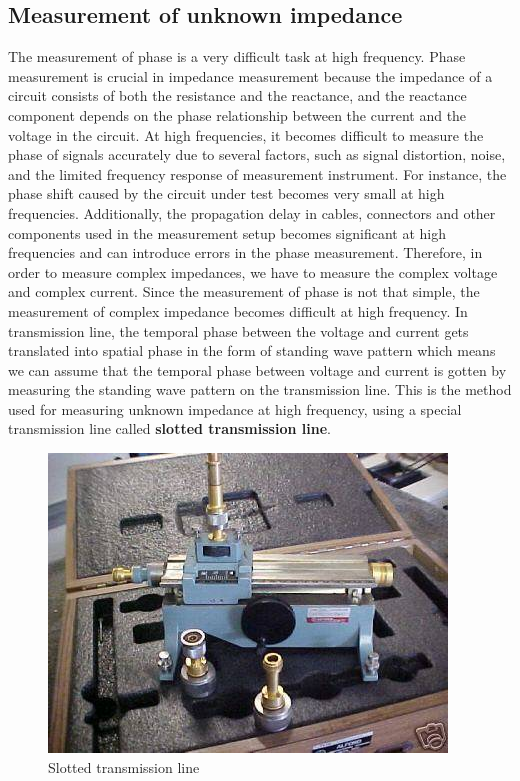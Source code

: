 \subsection{Measurement of unknown impedance}
The measurement of phase is a very difficult task at high frequency. Phase measurement is crucial in impedance measurement because the impedance of a circuit consists of both the resistance and the reactance, and the reactance component depends on the phase relationship between the current and the voltage in the circuit. At high frequencies, it becomes difficult to measure the phase of signals accurately due to several factors, such as signal distortion, noise, and the limited frequency response of measurement instrument. For instance, the phase shift caused by the circuit under test becomes very small at high frequencies. Additionally, the propagation delay in cables, connectors and other components used in the measurement setup becomes significant at high frequencies and can introduce errors in the phase measurement. Therefore, in order to measure complex impedances, we have to measure the complex voltage and complex current. Since the measurement of phase is not that simple, the measurement of complex impedance becomes difficult at high frequency. In transmission line, the temporal phase between the voltage and current gets translated into spatial phase in the form of standing wave pattern which means we can assume that the temporal phase between voltage and current is gotten by measuring the standing wave pattern on the transmission line. This is the method used for measuring unknown impedance at high frequency, using a special transmission line called \textbf{slotted
transmission line}.
\begin{figure}[h]
\centering
\includegraphics[width=1\linewidth]{./graphics/slottedT}
\caption{Slotted transmission line}
\label{fig:slottedT}
\end{figure}

